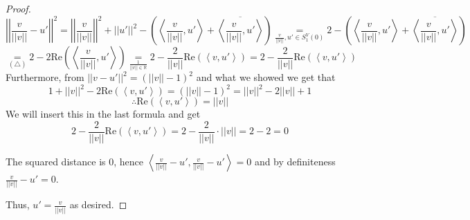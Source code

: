 \documentclass[english]{article}
\theoremstyle{definition}
\theoremstyle{plain}
\theoremstyle{plain}
\theoremstyle{definition}
\theoremstyle{definition}
\begin{document}
\begin{proof}
\[
\left|\left|\frac{v}{||v||}-u'\right|\right|^{2}=\left|\left|\frac{v}{||v||}\right|\right|^{2}+||u'||^{2}-\left(\left\langle \frac{v}{||v||},u'\right\rangle +\overline{\left\langle \frac{v}{||v||},u'\right\rangle }\right)\underset{\frac{v}{||v||},u'\in S_{1}^{V}(0)}{=}2-\left(\left\langle \frac{v}{||v||},u'\right\rangle +\overline{\left\langle \frac{v}{||v||},u'\right\rangle }\right)
\]
\[
\underset{\left(\triangle\right)}{=}2-2\text{Re}\left(\left\langle \frac{v}{||v||},u'\right\rangle \right)\underset{\frac{1}{\left|\left|v\right|\right|\in\mathbb{R}}}{=}2-\frac{2}{\left|\left|v\right|\right|}\text{Re}\left(\left\langle v,u'\right\rangle \right)=2-\frac{2}{\left|\left|v\right|\right|}\text{Re}\left(\left\langle v,u'\right\rangle \right)
\]
Furthermore, from $||v-u'||^{2}=\left(||v||-1\right)^{2}$ and what
we showed we get that 
\[
1+||v||^{2}-2\text{Re}\left(\left\langle v,u'\right\rangle \right)=\left(||v||-1\right)^{2}=||v||^{2}-2||v||+1
\]
\[
\therefore\text{Re}\left(\left\langle v,u'\right\rangle \right)=||v||
\]
We will insert this in the last formula and get
\[
2-\frac{2}{\left|\left|v\right|\right|}\text{Re}\left(\left\langle v,u'\right\rangle \right)=2-\frac{2}{\left|\left|v\right|\right|}\cdot||v||=2-2=0
\]

The squared distance is 0, hence $\left\langle \frac{v}{||v||}-u',\frac{v}{||v||}-u'\right\rangle =0$
and by definiteness $\frac{v}{||v||}-u'=0$.

Thus, $u'=\frac{v}{||v||}$ as desired.
\end{proof}
\end{document}
